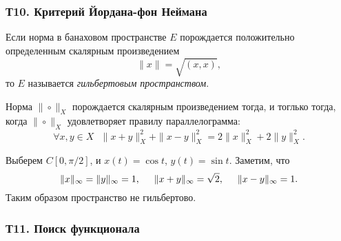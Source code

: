 \subsubsection*{Т10. Критерий Йордана-фон Неймана}

\begin{to_def}
    Если норма в банаховом пространстве $E$ порождается положительно определенным скалярным произведением 
    \begin{equation*}
        \|x\| = \sqrt{(x, x)},
    \end{equation*}
    то $E$ называется \textit{гильбертовым пространством}.
\end{to_def}

\begin{to_thr}
    Норма $\|\circ\|_X$ порождается скалярным произведением тогда, и тоглько тогда, когда
    $\|\circ\|_X$ удовлетворяет правилу параллелограмма:
    \begin{equation*}
        \forall x, y \in X \ \ \ 
        \|x+y\|^2_X + \|x-y\|^2_X = 2 \|x\|_X^2 + 2 \|y\|_X^2.
    \end{equation*}
\end{to_thr}

\noindent
Выберем $C[0, \pi/2]$, и $x(t) = \cos t$, $y(t) = \sin t $. Заметим, что
\begin{equation*}
    \|x\|_{\infty} = \|y\|_{\infty} = 1,
    \hspace{5 mm}
    \|x+y\|_{\infty} = \sqrt{2}, \hspace{5 mm} \|x-y\|_\infty = 1.
\end{equation*}
Таким образом пространство не гильбертово.


\subsubsection*{Т11. Поиск функционала}



